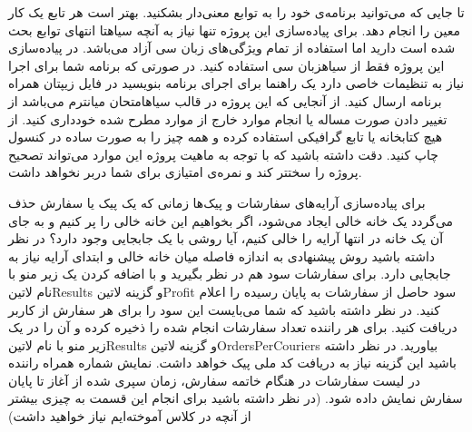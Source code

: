 
     تا جایی که می‌توانید برنامه‌ی خود را به توابع معنی‌دار بشکنید. بهتر است هر تابع یک کار معین را انجام دهد.
     برای پیاده‌سازی این پروژه تنها نیاز به آنچه ‌سیاه{تا انتهای توابع} بحث شده است دارید اما استفاده از تمام ویژگی‌های زبان سی آزاد می‌باشد.
     در پیاده‌سازی این پروژه فقط از ‌سیاه{زبان سی} استفاده کنید. در صورتی که برنامه شما برای اجرا نیاز به تنظیمات خاصی دارد یک راهنما برای اجرای برنامه بنویسید در فایل زیپتان همراه برنامه ارسال کنید.
     از آنجایی که این پروژه در قالب ‌سیاه{امتحان میانترم} می‌باشد از تغییر دادن صورت مساله یا انجام موارد خارج از موارد مطرح شده خودداری کنید.
     از هیچ کتابخانه یا تابع گرافیکی استفاده کرده و همه چیز را به صورت ساده در کنسول چاپ کنید. دقت داشته باشید که با توجه به ماهیت پروژه این موارد می‌تواند تصحیح پروژه را سختتر کند و نمره‌ی امتیازی برای شما دربر نخواهد داشت.


     برای پیاده‌سازی آرایه‌های سفارشات و پیک‌ها زمانی که یک پیک یا سفارش حذف می‌گردد یک خانه خالی ایجاد می‌شود، اگر بخواهیم این خانه خالی را پر کنیم و به جای آن یک خانه در انتها آرایه را خالی کنیم، آیا روشی با یک جابجایی وجود دارد؟ در نظر داشته باشید روش پیشنهادی به اندازه فاصله میان خانه خالی و ابتدای آرایه نیاز به جابجایی دارد.
     برای سفارشات سود هم در نظر بگیرید و با اضافه کردن یک زیر منو با نام ‌لاتین{Results} و گزینه ‌لاتین{Profit} سود حاصل از سفارشات به پایان رسیده را اعلام کنید. در نظر داشته باشید که شما می‌بایست این سود را برای هر سفارش از کاربر دریافت کنید.
     برای هر راننده تعداد سفارشات انجام شده را ذخیره کرده و آن را در یک زیر منو با نام ‌لاتین{Results} و گزینه ‌لاتین{OrdersPerCouriers} بیاورید. در نظر داشته باشید این گزینه نیاز به دریافت کد ملی پیک خواهد داشت.
     نمایش شماره همراه راننده در لیست سفارشات
     در هنگام خاتمه سفارش، زمان سپری شده از آغاز تا پایان سفارش نمایش داده شود. (در نظر داشته باشید برای انجام این قسمت به چیزی بیشتر از آنچه در کلاس آموخته‌ایم نیاز خواهید داشت)
